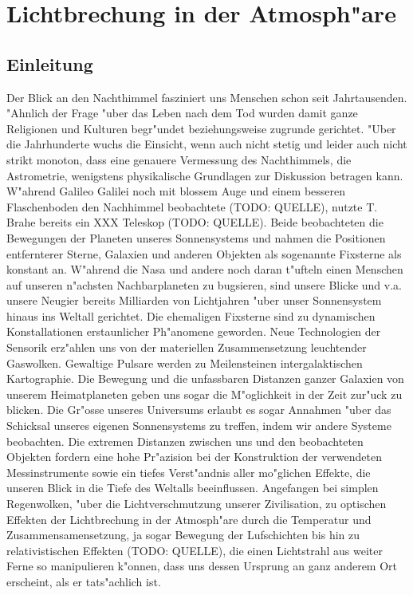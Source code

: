 \chapter{Lichtbrechung in der Atmosph"are\label{chapter:thema}}
\begin{refsection}


\section{Einleitung}
Der Blick an den Nachthimmel fasziniert uns Menschen schon seit Jahrtausenden. "Ahnlich der Frage "uber das Leben nach dem Tod wurden damit ganze Religionen und Kulturen begr"undet beziehungsweise zugrunde gerichtet. 
"Uber die Jahrhunderte wuchs die Einsicht, wenn auch nicht stetig und leider auch nicht strikt monoton, dass eine genauere Vermessung des Nachthimmels, die Astrometrie, wenigstens physikalische Grundlagen zur Diskussion betragen kann. 
W"ahrend Galileo Galilei noch mit blossem Auge und einem besseren Flaschenboden den Nachhimmel beobachtete (TODO: QUELLE), nutzte T. Brahe bereits ein XXX Teleskop (TODO: QUELLE). 
Beide beobachteten die Bewegungen der Planeten unseres Sonnensystems und nahmen die Positionen entfernterer Sterne, Galaxien und anderen Objekten als sogenannte Fixsterne als konstant an. 
W"ahrend die Nasa und andere noch daran t"ufteln einen Menschen auf unseren n"achsten Nachbarplaneten zu bugsieren, sind unsere Blicke und v.a. unsere Neugier bereits Milliarden von Lichtjahren "uber unser Sonnensystem hinaus ins Weltall gerichtet. 
Die ehemaligen Fixsterne sind zu dynamischen Konstallationen erstaunlicher Ph"anomene geworden.
Neue Technologien der Sensorik erz"ahlen uns von der materiellen Zusammensetzung leuchtender Gaswolken. 
Gewaltige Pulsare werden zu Meilensteinen intergalaktischen Kartographie. 
Die Bewegung und die unfassbaren Distanzen ganzer Galaxien von unserem Heimatplaneten geben uns sogar die M"oglichkeit in der Zeit zur"uck zu blicken.
Die Gr"osse unseres Universums  erlaubt es sogar Annahmen "uber das Schicksal unseres eigenen Sonnensystems zu treffen, indem wir andere Systeme beobachten. 
Die extremen Distanzen zwischen uns und den beobachteten Objekten fordern eine hohe Pr"azision bei der Konstruktion der verwendeten Messinstrumente sowie ein tiefes Verst"andnis aller mo"glichen Effekte, die unseren Blick in die Tiefe des Weltalls beeinflussen. 
Angefangen bei simplen Regenwolken, "uber die Lichtverschmutzung unserer Zivilisation, zu optischen Effekten der Lichtbrechung in der Atmosph"are durch die Temperatur und Zusammensamensetzung, ja sogar Bewegung der Lufschichten bis hin zu relativistischen Effekten (TODO: QUELLE), die einen Lichtstrahl aus weiter Ferne so manipulieren k"onnen, dass uns dessen Ursprung an ganz anderem Ort erscheint, als er tats"achlich ist. 

\end{refsection}
